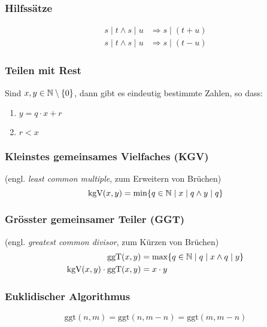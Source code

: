 \subsubsection{Hilfssätze}
\begin{align*}
  s \mid t \wedge s \mid u & \Rightarrow s \mid (t + u)\\
  s \mid t \wedge s \mid u & \Rightarrow s \mid (t - u)
\end{align*}

\subsubsection{Teilen mit Rest}
Sind $x, y \in \mathbb{N} \setminus \{0\}$, dann gibt es eindeutig bestimmte Zahlen, so dass:
\begin{enumerate}
	\item $y = q \cdot x + r$
	\item $r < x$
\end{enumerate}

\subsubsection{Kleinstes gemeinsames Vielfaches (KGV)}
(engl. \textit{least common multiple}, zum Erweitern von Brüchen)\\
\begin{equation*}
	\mbox{kgV}(x, y) = \min\{q \in \mathbb{N} \mid x \mid q \wedge y \mid q\}
\end{equation*}


\subsubsection{Grösster gemeinsamer Teiler (GGT)}
(engl. \textit{greatest common divisor}, zum Kürzen von Brüchen)\\
\begin{align*}
	\mbox{ggT}(x, y) &= \max\{q \in \mathbb{N} \mid q \mid x \wedge q \mid y\}\\
	\mbox{kgV}(x, y) \cdot \mbox{ggT}(x, y) &= x \cdot y
\end{align*}


\subsubsection{Euklidischer Algorithmus}
\begin{equation*}
	\mbox{ggt}(n, m) = \mbox{ggt}(n, m - n) = \mbox{ggt}(m, m - n)
\end{equation*}

